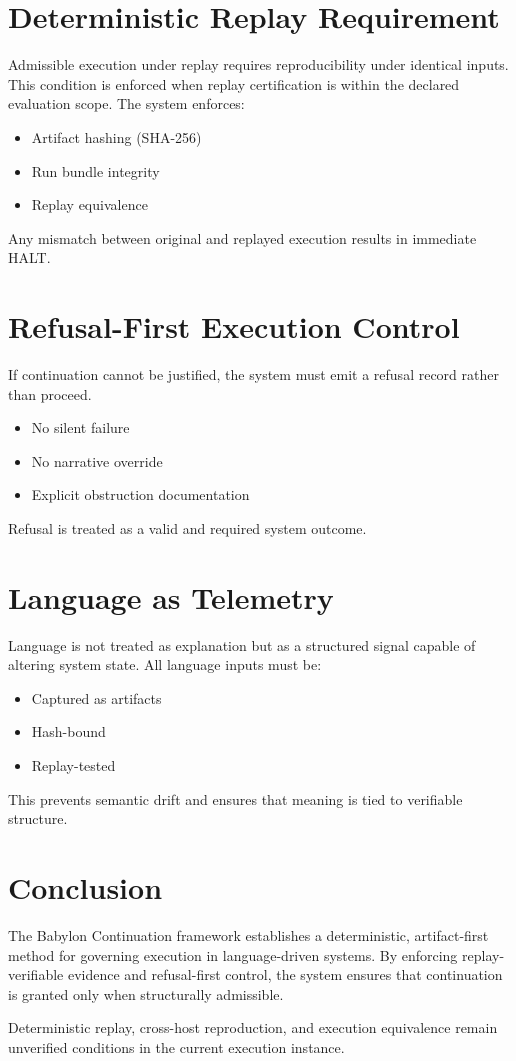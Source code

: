 \documentclass[11pt]{article}
\begin{document}
\section{Deterministic Replay Requirement}

Admissible execution under replay requires reproducibility under identical inputs. This condition is enforced when replay certification is within the declared evaluation scope. The system enforces:

\begin{itemize}
\item Artifact hashing (SHA-256)
\item Run bundle integrity
\item Replay equivalence
\end{itemize}

Any mismatch between original and replayed execution results in immediate HALT.

\section{Refusal-First Execution Control}

If continuation cannot be justified, the system must emit a refusal record rather than proceed.

\begin{itemize}
\item No silent failure
\item No narrative override
\item Explicit obstruction documentation
\end{itemize}

Refusal is treated as a valid and required system outcome.

\section{Language as Telemetry}

Language is not treated as explanation but as a structured signal capable of altering system state. All language inputs must be:

\begin{itemize}
\item Captured as artifacts
\item Hash-bound
\item Replay-tested
\end{itemize}

This prevents semantic drift and ensures that meaning is tied to verifiable structure.

\section{Conclusion}

The Babylon Continuation framework establishes a deterministic, artifact-first method for governing execution in language-driven systems. By enforcing replay-verifiable evidence and refusal-first control, the system ensures that continuation is granted only when structurally admissible.

Deterministic replay, cross-host reproduction, and execution equivalence remain unverified conditions in the current execution instance.
\end{document}
